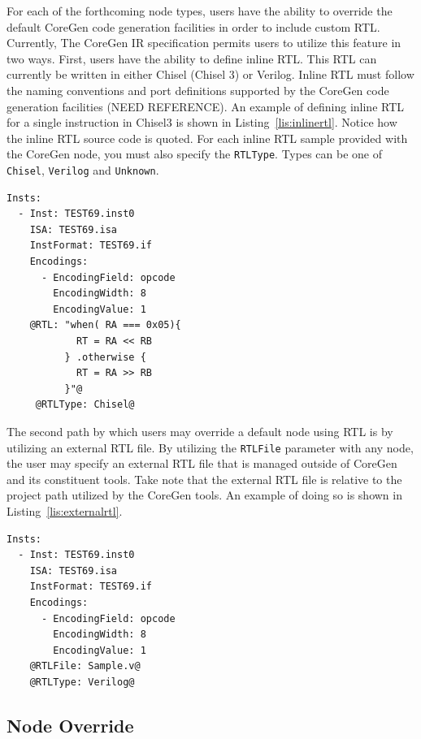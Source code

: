 \documentclass{article}
\begin{document}
For each of the forthcoming node types, users have the ability to override the 
default CoreGen code generation facilities in order to include custom RTL.  Currently, 
The CoreGen IR specification permits users to utilize this feature in two ways.  First, 
users have the ability to define inline RTL.  This RTL can currently be written in either 
Chisel (Chisel 3) or Verilog.  Inline RTL must follow the naming conventions and port 
definitions supported by the CoreGen code generation facilities (NEED REFERENCE).  
An example of defining inline RTL for a single instruction in Chisel3 is shown in Listing~\ref{lis:inlinertl}.  
Notice how the inline RTL source code is quoted.  For each inline RTL sample provided with the 
CoreGen node, you must also specify the \texttt{RTLType}.  Types can be one of \texttt{Chisel}, 
\texttt{Verilog} and \texttt{Unknown}.    

\vspace{0.125in}
\begin{lstlisting}[frame=single,style=base,showstringspaces=false,caption={Sample Inline RTL},captionpos=b,label={lis:inlinertl}]
Insts:
  - Inst: TEST69.inst0
    ISA: TEST69.isa
    InstFormat: TEST69.if
    Encodings:
      - EncodingField: opcode
        EncodingWidth: 8
        EncodingValue: 1
    @RTL: "when( RA === 0x05){
            RT = RA << RB
          } .otherwise {
            RT = RA >> RB
          }"@
     @RTLType: Chisel@
\end{lstlisting}  

The second path by which users may override a default node using RTL is by utilizing an external 
RTL file.  By utilizing the \texttt{RTLFile} parameter with any node, the user may specify an external 
RTL file that is managed outside of CoreGen and its constituent tools.  Take note that the external RTL 
file is relative to the project path utilized by the CoreGen tools.  An example of doing so is shown in 
Listing~\ref{lis:externalrtl}.  

\clearpage
\vspace{0.125in}
\begin{lstlisting}[frame=single,style=base,caption={Sample External RTL File},captionpos=b,label={lis:externalrtl}]
Insts:
  - Inst: TEST69.inst0
    ISA: TEST69.isa
    InstFormat: TEST69.if
    Encodings:
      - EncodingField: opcode
        EncodingWidth: 8
        EncodingValue: 1
    @RTLFile: Sample.v@
    @RTLType: Verilog@
\end{lstlisting}


\clearpage
\subsection{Node Override}
\label{sec:NodeOverride}
\end{document}
